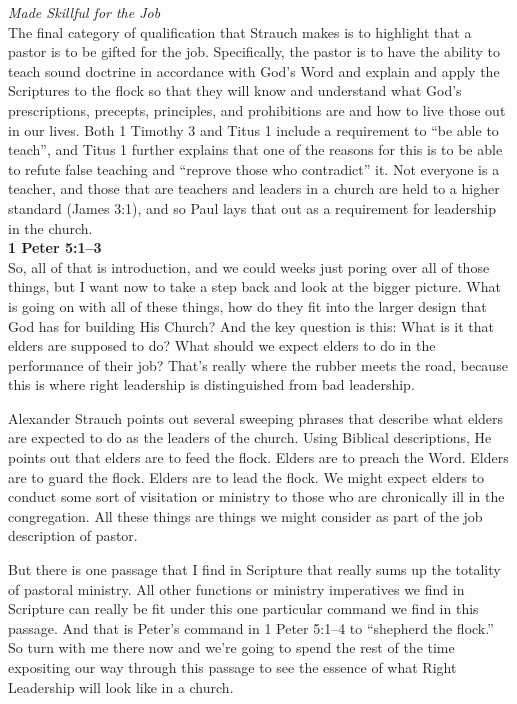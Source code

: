 \documentclass[letterpaper, 12pt]{article}
\begin{document}
    \noindent \emph{Made Skillful for the Job} \\

    The final category of qualification that Strauch makes is to
    highlight that a pastor is to be gifted for the job. Specifically,
    the pastor is to have the ability to teach sound doctrine in
    accordance with God's Word and explain and apply the Scriptures to
    the flock so that they will know and understand what God's
    prescriptions, precepts, principles, and prohibitions are and how to
    live those out in our lives. Both 1 Timothy 3 and Titus 1 include a
    requirement to ``be able to teach'', and Titus 1 further explains
    that one of the reasons for this is to be able to refute false
    teaching and ``reprove those who contradict'' it. Not everyone is a
    teacher, and those that are teachers and leaders in a church are
    held to a higher standard (James 3:1), and so Paul lays that out as
    a requirement for leadership in the church. \\

    \noindent \textbf{1 Peter 5:1--3} \\

    So, all of that is introduction, and we could weeks just poring
    over all of those things, but I want now to take a step back and
    look at the bigger picture. What is going on with all of these
    things, how do they fit into the larger design that God has for
    building His Church? And the key question is this: What is it that
    elders are supposed to do? What should we expect elders to do in the
    performance of their job? That's really where the rubber meets the
    road, because this is where right leadership is distinguished from
    bad leadership.

    Alexander Strauch points out several sweeping phrases that describe
    what elders are expected to do as the leaders of the church. Using
    Biblical descriptions, He points out that elders are to feed the
    flock. Elders are to preach the Word. Elders are to guard the flock.
    Elders are to lead the flock.  We might expect elders to conduct
    some sort of visitation or ministry to those who are chronically ill
    in the congregation. All these things are things we might consider
    as part of the job description of pastor.

    But there is one passage that I find in Scripture that really sums
    up the totality of pastoral ministry. All other functions or
    ministry imperatives we find in Scripture can really be fit under
    this one particular command we find in this passage. And that is
    Peter's command in 1 Peter 5:1--4 to ``shepherd the flock.'' So turn
    with me there now and we're going to spend the rest of the time
    expositing our way through this passage to see the essence of what
    Right Leadership will look like in a church.
\end{document}
